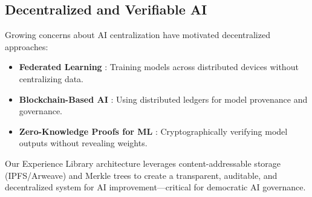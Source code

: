 \subsection{Decentralized and Verifiable AI}

Growing concerns about AI centralization have motivated decentralized approaches:
\begin{itemize}
    \item \textbf{Federated Learning} \cite{mcmahan2017communication}: Training models across distributed devices without centralizing data.
    \item \textbf{Blockchain-Based AI} \cite{salah2019blockchain}: Using distributed ledgers for model provenance and governance.
    \item \textbf{Zero-Knowledge Proofs for ML} \cite{ghodsi2017safetynets}: Cryptographically verifying model outputs without revealing weights.
\end{itemize}

Our Experience Library architecture leverages content-addressable storage (IPFS/Arweave) and Merkle trees to create a transparent, auditable, and decentralized system for AI improvement—critical for democratic AI governance.

